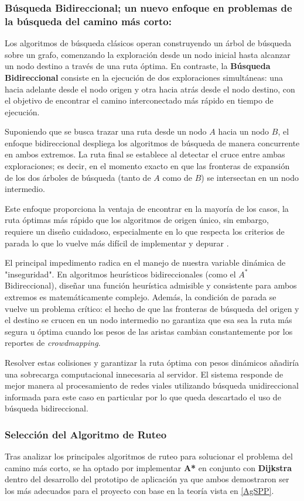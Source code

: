 \subsubsection{Búsqueda Bidireccional; un nuevo enfoque en problemas de la búsqueda del camino más corto:}

Los algoritmos de búsqueda clásicos operan construyendo un árbol de búsqueda sobre un grafo, comenzando la exploración desde un nodo inicial hasta alcanzar un nodo destino a través de una ruta óptima. En contraste, la \textbf{Búsqueda Bidireccional} consiste en la ejecución de dos exploraciones simultáneas: una hacia adelante desde el nodo origen y otra hacia atrás desde el nodo destino, con el objetivo de encontrar el camino interconectado más rápido en tiempo de ejecución.

Suponiendo que se busca trazar una ruta desde un nodo $A$ hacia un nodo $B$, el enfoque bidireccional despliega los algoritmos de búsqueda de manera concurrente en ambos extremos. La ruta final se establece al detectar el cruce entre ambas exploraciones; es decir, en el momento exacto en que las fronteras de expansión de los dos árboles de búsqueda (tanto de $A$ como de $B$) se intersectan en un nodo intermedio.

Este enfoque proporciona la ventaja de encontrar en la mayoría de los casos, la ruta óptimas más rápido que los algoritmos de origen único, sin embargo, requiere un diseño cuidadoso, especialmente en lo que respecta los criterios de parada lo que lo vuelve más difícil de implementar y depurar \cite{baeldung_bidirectional_search}. 
    
El principal impedimento radica en el manejo de nuestra variable dinámica de "inseguridad". En algoritmos heurísticos bidireccionales (como el $A^*$ Bidireccional), diseñar una función heurística admisible y consistente para ambos extremos es matemáticamente complejo. Además, la condición de parada se vuelve un problema crítico: el hecho de que las fronteras de búsqueda del origen y el destino se crucen en un nodo intermedio no garantiza que esa sea la ruta más segura u óptima cuando los pesos de las aristas cambian constantemente por los reportes de \textit{crowdmapping}.

Resolver estas colisiones y garantizar la ruta óptima con pesos dinámicos añadiría una sobrecarga computacional innecesaria al servidor. El sistema responde de mejor manera al procesamiento de redes viales utilizando búsqueda unidireccional informada para este caso en particular por lo que queda descartado el uso de búsqueda bidireccional.

\subsubsection{Selección del Algoritmo de Ruteo}

Tras analizar los principales algoritmos de ruteo para solucionar el problema del camino más corto, se ha optado por implementar \textbf{A*} en conjunto con \textbf{Dijkstra} dentro del desarrollo del prototipo de aplicación ya que ambos demostraron ser los más adecuados para el proyecto con base en la teoría vista en \ref{AgSPP}.

